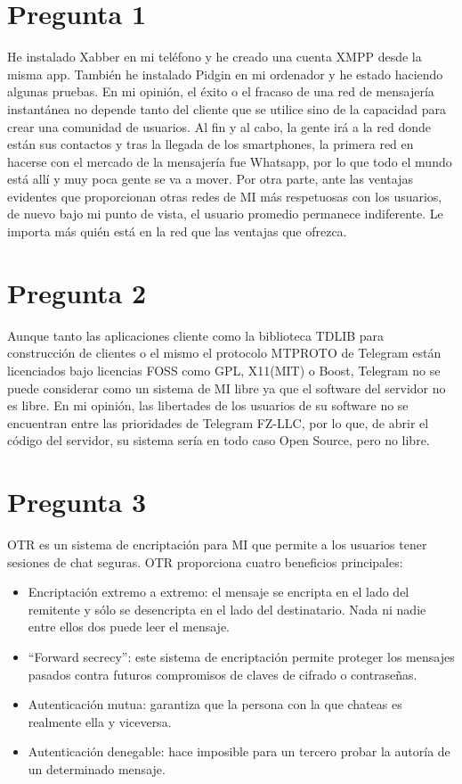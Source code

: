\section{Pregunta 1}
He instalado Xabber en mi teléfono y he creado una cuenta XMPP desde la misma app. También he instalado Pidgin en mi ordenador y he estado haciendo algunas pruebas. En mi opinión, el éxito o el fracaso de una red de mensajería instantánea no depende tanto del cliente que se utilice sino de la capacidad para crear una comunidad de usuarios. Al fin y al cabo, la gente irá a la red donde están sus contactos y tras la llegada de los smartphones, la primera red en hacerse con el mercado de la mensajería fue Whatsapp, por lo que todo el mundo está allí y muy poca gente se va a mover. Por otra parte, ante las ventajas evidentes que proporcionan otras redes de MI más respetuosas con los usuarios, de nuevo bajo mi punto de vista, el usuario promedio permanece indiferente. Le importa más quién está en la red que las ventajas que ofrezca.

\section{Pregunta 2}
Aunque tanto las aplicaciones cliente como la biblioteca TDLIB para construcción de clientes o el mismo el protocolo MTPROTO de Telegram están licenciados bajo licencias FOSS como GPL, X11(MIT) o Boost, Telegram no se puede considerar como un sistema de MI libre ya que el software del servidor no es libre. En mi opinión, las libertades de los usuarios de su software no se encuentran entre las prioridades de Telegram FZ-LLC, por lo que, de abrir el código del servidor, su sistema sería en todo caso Open Source, pero no libre.

\section{Pregunta 3}
OTR es un sistema de encriptación para MI que permite a los usuarios tener sesiones de chat seguras. OTR proporciona cuatro beneficios principales:
\begin{itemize}
    \item Encriptación extremo a extremo: el mensaje se encripta en el lado del remitente y sólo se desencripta en el lado del destinatario. Nada ni nadie entre ellos dos puede leer el mensaje.
    \item ``Forward secrecy'': este sistema de encriptación permite proteger los mensajes pasados contra futuros compromisos de claves de cifrado o contraseñas.
    \item Autenticación mutua: garantiza que la persona con la que chateas es realmente ella y viceversa.
    \item Autenticación denegable: hace imposible para un tercero probar la autoría de un determinado mensaje.
\end{itemize}

